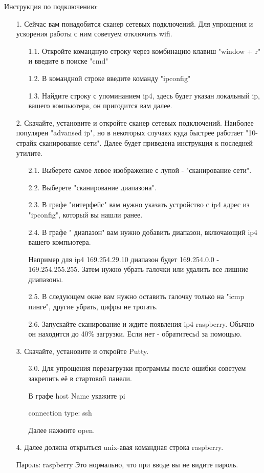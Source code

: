 Инструкция по подключению:
\begin{enumerate}
    \item[1.] Сейчас вам понадобится сканер сетевых подключений. Для упрощения и ускорения работы с ним советуем отключить wifi.
    \begin{enumerate} 
        \item[1.1.] Откройте командную строку через комбинацию клавиш "window + r" и введите в поиске "cmd"
        \item[1.2.] В командной строке введите команду "ipconfig"
        \item[1.3.] Найдите строку с упоминанием  ip4, здесь будет указан локальный ip, вашего компьютера, он пригодится вам далее.
    \end{enumerate}
    \item[2.] Скачайте, установите и откройте сканер сетевых подключений. Наиболее популярен "advansed ip", но в некоторых случаях куда быстрее работает "10-страйк сканирование сети". Далее будет приведена инструкция к последней утилите.
    \begin{enumerate}
        \item[2.1.] Выберете самое левое изображение с лупой - "сканирование сети".
        \item[2.2.] Выберете "сканирование диапазона".
        \item[2.3.] В графе "интерфейс" вам нужно указать устройство с  ip4 адрес из "ipconfig", который вы нашли ранее.
        \item[2.4.] В графе " диапазон" вам нужно добавить диапазон, включающий ip4 вашего компьютера.
        
        Например для ip4 169.254.29.10 диапазон будет 169.254.0.0 - 169.254.255.255. Затем нужно убрать галочки или удалить все лишние диапазоны.
        \item[2.5.] В следующем окне вам нужно оставить галочку только на "icmp пинге", другие убрать, цифры не трогать.
        \item[2.6.] Запускайте сканирование и ждите появления ip4 raspberry. Обычно он находится до 40\% загрузки. Если нет - обратитесьd за помощью.
    \end{enumerate}
    \item[3.] Скачайте, установите и откройте Putty.
    \begin{enumerate}
        \item[3.0.] Для упрощения перезагрузки программы после ошибки советуем закрепить её в стартовой панели.
        
        В графе host Name укажите pi\@<адрес ip4 из сканера>
        
        connection type: ssh

        Далее нажмите open.
    \end{enumerate}
    \item[4.] Далее должна открыться unix-авая командная строка raspberry.
    
    Пароль: raspberry
    Это нормально, что при вводе вы не видите пароль.
\end{enumerate}

